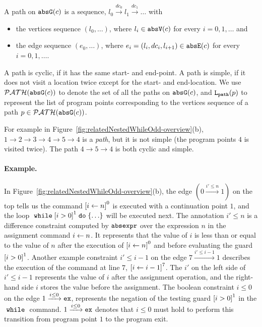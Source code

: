 \begin{defn}[Path]
 \label{def:abs_cfgpath} 
 A path on $\mathtt{abs}{\mathtt{G}}(c)$ is a sequence, $ l_0 \xrightarrow{dc_0} l_1 \xrightarrow{dc_1} \ldots $ with
 \begin{itemize}
 \item the vertices sequence $(l_0, \ldots)$, where $l_i \in \mathtt{abs}{\mathtt{V}}(c)$ for every $i = 0, 1, \ldots$ and
 \item the edge sequence $(e_0, \ldots)$, where $e_i = (l_{i}, dc_i, l_{i + 1}) \in \mathtt{abs}{\mathtt{E}}(c)$ for every $i = 0, 1, \ldots$.
 \end{itemize}
 A path is cyclic, if it has the same start- and end-point. A path is simple, if it does not visit a location twice except for the start- and end-location. We use $\mathcal{PATH}(\mathtt{abs}{\mathtt{G}}(c))$ to denote the set of all the paths on $\mathtt{abs}{\mathtt{G}}(c)$,
 and $\mathtt{L}_{\mathtt{path}}(p)$ to represent the list of program points corresponding to the vertices sequence of a path $p \in \mathcal{PATH}(\mathtt{abs}{\mathtt{G}}(c))$.
 \end{defn}
 For example in Figure~\ref{fig:relatedNestedWhileOdd-overview}(b), $1 \to 2 \to 3 \to 4 \to 5 \to 4$ is a \emph{path}, but it is not simple (the program points $4$ is visited twice). The path $4 \to 5 \to 4$ is both cyclic and simple.
% 
% 
\paragraph{Example.}
In Figure~\ref{fig:relatedNestedWhileOdd-overview}(b),
the edge $(0 \xrightarrow{i' \leq n} 1)$ on the top tells us the command 
$\clabel{\assign{i}{n}}^0$ is executed with a continuation point $1$, and the
loop $\ewhile \clabel{i > 0}^1 \edo \{\ldots\}$ will be executed next.
The annotation $i' \leq n$ is a difference constraint 
computed by $\mathtt{abs}{\mathtt{expr}}$ over
the expression $n$ in the assignment command $\mathrel{ i \leftarrow n }$.
It represents that the value of $i$ is less than or equal to the value of $n$ after the
execution of $\clabel{\assign{i}{n}}^0$ and before evaluating the guard $\clabel{i > 0}^1$.
Another example constraint $i' \leq i - 1$ on the edge $7 \xrightarrow{i' \leq i - 1} 1$
describes the execution of
 the command at line $7$, 
$\clabel{\assign{i}{i - 1}}^{7}$. 
The $i'$ on the left side of $i' \leq i - 1$ represents the value of $i$ after the assignment operation,
and the right-hand side $i$ stores the value before the assignment.
The boolean constraint $i \leq 0 $ on the edge $1 \xrightarrow{i \leq 0} \mathtt{ex}$, 
represents the negation of the testing guard $\clabel{i > 0}^1$
in the $\;\mathtt{while}\;$ command.
$1 \xrightarrow{i \leq 0} \mathtt{ex}$ denotes that $i \leq 0$ must hold to perform this transition from program point $1$ to
the program exit. 